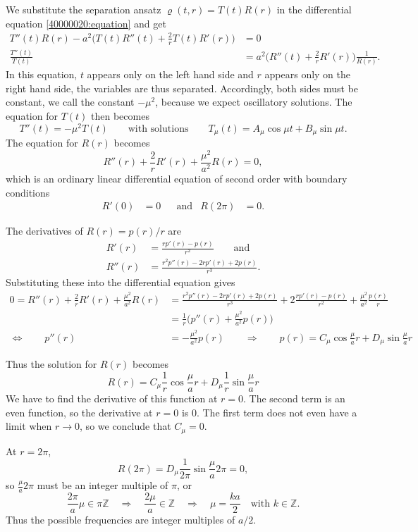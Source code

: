 \begin{loesung}
\begin{teilaufgaben}
\item
We substitute the separation ansatz $\varrho(t,r)=T(t)R(r)$ in the
differential equation \eqref{40000020:equation} and get
\begin{align*}
T''(t) R(r)
-a^2
\biggl(
T(t)R''(t) + \frac2r T(t)R'(r)
\biggr)
&=
0
\\
\frac{T''(t)}{T(t)}
&=
a^2
\biggl(
R''(t) + \frac2r R'(r)
\biggr)
\frac1{R(r)}.
\end{align*}
In this equation, $t$ appears only on the left hand side and $r$ appears
only on the right hand side, the variables are thus separated.
Accordingly, both sides must be constant, we call the constant $-\mu^2$,
because we expect oscillatory solutions.
The equation for $T(t)$ then becomes
\[
T''(t) = -\mu^2 T(t)
\qquad
\text{with solutions}
\qquad
T_\mu(t) = A_\mu \cos \mu t + B_\mu \sin \mu t.
\]
The equation for $R(r)$ becomes
\[
R''(r) +\frac2r R'(r) + \frac{\mu^2}{a^2} R(r) = 0,
\]
which is an ordinary linear differential equation of second
order with boundary conditions
\[
\begin{aligned}
R'(0)&=0
&&\text{and}&
R(2\pi)&=0.
\end{aligned}
\]
\item
The derivatives of $R(r)=p(r)/r$ are
\begin{align*}
R'(r)
&=
\frac{rp'(r)-p(r)}{r^2}
\qquad\text{and}\\
R''(r)
&=
\frac{r^2p''(r) -2rp'(r) + 2p(r)}{r^3}
.
\end{align*}
Substituting these into the differential equation gives
\begin{align*}
0=
R''(r) +\frac2r R'(r) + \frac{\mu^2}{a^2} R(r)
&=
\frac{r^2p''(r) -2rp'(r) + 2p(r)}{r^3}
+2
\frac{rp'(r)-p(r)}{r^2}
+\frac{\mu^2}{a^2}
\frac{p(r)}{r}
\\
&=
\frac1r\biggl( p''(r) +\frac{\mu^2}{a^2} p(r)\biggr)
\\
\Leftrightarrow\qquad
p''(r)
&=
-\frac{\mu^2}{a^2} p(r)
\qquad\Rightarrow\qquad
p(r)
=
C_\mu \cos\frac{\mu}{a} r + D_\mu \sin\frac{\mu}{a} r
\end{align*}
\item
Thus the solution for $R(r)$ becomes
\[
R(r)
= 
C_\mu \frac1r \cos\frac{\mu}{a} r + D_\mu \frac1r \sin\frac{\mu}{a} r
\]
We have to find the derivative of this function at $r=0$.
The second term is an even function, so the derivative at $r=0$ is 0.
The first term does not even have a limit when $r\to 0$, so we conclude
that $C_\mu=0$.

At $r=2\pi$,
\[
R(2\pi)=D_\mu\frac1{2\pi}\sin\frac{\mu}{a}2\pi = 0,
\]
so $\frac{\mu}a 2\pi$ must be an integer multiple of $\pi$, or
\[
\frac{2\pi}{a}\mu\in\pi\mathbb Z
\quad\Rightarrow\quad
\frac{2\mu}{a}\in\mathbb Z
\quad\Rightarrow\quad
\mu = \frac{ka}{2}\quad \text{with $k\in\mathbb Z$}.
\]
Thus the possible frequencies are integer multiples of $a/2$.
\end{teilaufgaben}
\end{loesung}

